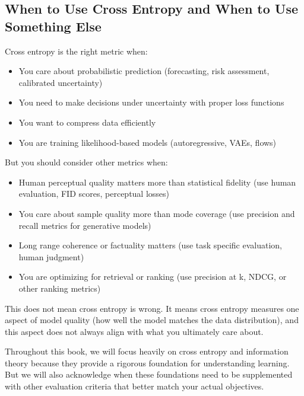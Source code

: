 \subsection{When to Use Cross Entropy and When to Use Something Else}

Cross entropy is the right metric when:

\begin{itemize}
\item You care about probabilistic prediction (forecasting, risk assessment, calibrated uncertainty)
\item You need to make decisions under uncertainty with proper loss functions
\item You want to compress data efficiently
\item You are training likelihood-based models (autoregressive, VAEs, flows)
\end{itemize}

But you should consider other metrics when:

\begin{itemize}
\item Human perceptual quality matters more than statistical fidelity (use human evaluation, FID scores, perceptual losses)
\item You care about sample quality more than mode coverage (use precision and recall metrics for generative models)
\item Long range coherence or factuality matters (use task specific evaluation, human judgment)
\item You are optimizing for retrieval or ranking (use precision at k, NDCG, or other ranking metrics)
\end{itemize}

This does not mean cross entropy is wrong. It means cross entropy measures one aspect of model quality (how well the model matches the data distribution), and this aspect does not always align with what you ultimately care about.

Throughout this book, we will focus heavily on cross entropy and information theory because they provide a rigorous foundation for understanding learning. But we will also acknowledge when these foundations need to be supplemented with other evaluation criteria that better match your actual objectives.

\vspace{2em}


